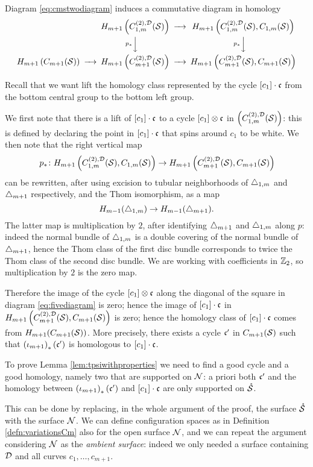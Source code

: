 Diagram \eqref{eq:cmstwodiagram} induces a commutative diagram in homology
\begin{equation}
 \label{eq:fivediagram}
\minCDarrowwidth15pt
 \begin{CD}
  @. H_{m+1}\pa{\fmstwoD} @>>> H_{m+1}\pa{\fmstwoD, C_{1,m}(\S)}\\
  @. @V\p_*VV @V\p_*VV\\
  H_{m+1}\pa{ C_{m+1}(\S)} @>>> H_{m+1}\pa{\cmstwoD} @>>> H_{m+1}\pa{\cmstwoD,C_{m+1}(\S)}
 \end{CD}
\end{equation}

Recall that we want lift the homology class represented by the cycle $[c_1]\cdot\fc$
from the bottom central group to the bottom left group.

We first note that there is a lift of $[c_1]\cdot\fc$ to a cycle $[c_1]\otimes\fc$ in $\pa{\fmstwoD}$:
this is defined by declaring the point in $[c_1]\cdot\fc$ that spins around $c_1$
to be white. We then note that the right vertical map
\[
\p_*\colon H_{m+1}\pa{\fmstwoD, C_{1,m}(\S)} \to H_{m+1}\pa{\cmstwoD,C_{m+1}(\S)}
\]
can be rewritten, after using excision to tubular neighborhoods of $\Donem$ and $\Dmone$ respectively,
and the Thom isomorphism, as a map
\[
 H_{m-1}(\Donem)\to H_{m-1}(\Dmone).
\]
The latter map is multiplication by $2$, after identifying $\Dmone$ and $\Donem$ along $p$:
indeed the normal bundle of $\Donem$ is a
double covering of the normal bundle of $\Dmone$, hence the Thom class of the first disc
bundle corresponds to twice the Thom class of the second disc bundle. We are working
with coefficients in $\Z_2$, so multiplication by $2$ is the zero map.

Therefore the image of the cycle $[c_1]\otimes \fc$ along the diagonal of the square
in diagram \eqref{eq:fivediagram} is zero; hence the image of $[c_1]\cdot\fc$ in $H_{m+1}\pa{\cmstwoD,C_{m+1}(\S)}$
is zero; hence the homology class of $[c_1]\cdot\fc$ comes from $H_{m+1}(C_{m+1}(\S))$. More
precisely, there exists a cycle $\fc'$ in $C_{m+1}(\S)$ such that $\pa{\iota_{m+1}}_*(\fc')$ is homologous
to $[c_1]\cdot\fc$.

To prove Lemma \ref{lem:tpsiwithproperties} we need to find a good cycle and
a good homology, namely two that are supported on $\N$: a priori both $\fc'$ and the homology
between $\pa{\iota_{m+1}}_*(\fc')$ and $[c_1]\cdot\fc$ are only supported on $\mrS$.

This can be done by replacing, in the whole argument of the proof, the surface $\mrS$ with the surface $\N$.
We can define configuration spaces as in Definition \ref{defn:variationsCm} also for the open surface
$\N$, and we can repeat the argument considering $\N$ as the \emph{ambient surface}:
indeed we only needed a surface containing $\D$ and all curves $c_1,\dots,c_{m+1}$.


